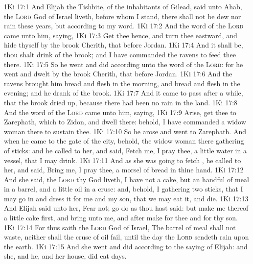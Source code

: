 \vs 1Ki 17:1 And Elijah the Tishbite,  of the inhabitants of Gilead, said unto Ahab,  the \textsc{Lord} God of Israel liveth, before whom I stand, there shall not be dew nor rain these years, but according to my word.
\vs 1Ki 17:2 And the word of the \textsc{Lord} came unto him, saying,
\vs 1Ki 17:3 Get thee hence, and turn thee eastward, and hide thyself by the brook Cherith, that  before Jordan.
\vs 1Ki 17:4 And it shall be,  thou shalt drink of the brook; and I have commanded the ravens to feed thee there.
\vs 1Ki 17:5 So he went and did according unto the word of the \textsc{Lord}: for he went and dwelt by the brook Cherith, that  before Jordan.
\vs 1Ki 17:6 And the ravens brought him bread and flesh in the morning, and bread and flesh in the evening; and he drank of the brook.
\vs 1Ki 17:7 And it came to pass after a while, that the brook dried up, because there had been no rain in the land.
\vs 1Ki 17:8 And the word of the \textsc{Lord} came unto him, saying,
\vs 1Ki 17:9 Arise, get thee to Zarephath, which  to Zidon, and dwell there: behold, I have commanded a widow woman there to sustain thee.
\vs 1Ki 17:10 So he arose and went to Zarephath. And when he came to the gate of the city, behold, the widow woman  there gathering of sticks: and he called to her, and said, Fetch me, I pray thee, a little water in a vessel, that I may drink.
\vs 1Ki 17:11 And as she was going to fetch , he called to her, and said, Bring me, I pray thee, a morsel of bread in thine hand.
\vs 1Ki 17:12 And she said,  the \textsc{Lord} thy God liveth, I have not a cake, but an handful of meal in a barrel, and a little oil in a cruse: and, behold, I  gathering two sticks, that I may go in and dress it for me and my son, that we may eat it, and die.
\vs 1Ki 17:13 And Elijah said unto her, Fear not; go  do as thou hast said: but make me thereof a little cake first, and bring  unto me, and after make for thee and for thy son.
\vs 1Ki 17:14 For thus saith the \textsc{Lord} God of Israel, The barrel of meal shall not waste, neither shall the cruse of oil fail, until the day  the \textsc{Lord} sendeth rain upon the earth.
\vs 1Ki 17:15 And she went and did according to the saying of Elijah: and she, and he, and her house, did eat  days.
